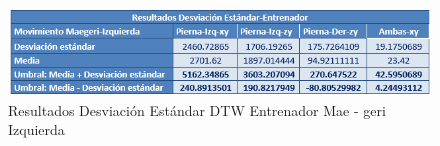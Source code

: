 \begin{figure}[H]%
	\begin{center}
		\includegraphics[scale=1]{./Figuras/Implementacion/Pruebas/Tablas/ResultadorDesvEstandar_Entrenador_Maegeri-Izquierdo}
	\end{center}
	\caption{Resultados Desviación Estándar DTW Entrenador Mae - geri Izquierda}
	\label{fig:ResultadosDTW_Entrenador_Maegeri-Izquierdo}
\end{figure}
\clearpage

